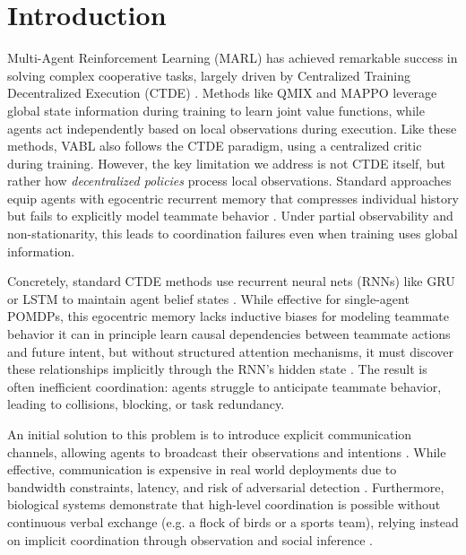\documentclass{article}
\theoremstyle{plain}
\theoremstyle{definition}
\theoremstyle{remark}
\begin{document}
\section{Introduction}

Multi-Agent Reinforcement Learning (MARL) has achieved remarkable success in solving complex cooperative tasks, largely driven by Centralized Training Decentralized Execution (CTDE) \cite{lowe2017multi}. Methods like QMIX \cite{rashid2020monotonic} and MAPPO \cite{yu2022surprising} leverage global state information during training to learn joint value functions, while agents act independently based on local observations during execution. Like these methods, VABL also follows the CTDE paradigm, using a centralized critic during training. However, the key limitation we address is not CTDE itself, but rather how \emph{decentralized policies} process local observations. Standard approaches equip agents with egocentric recurrent memory that compresses individual history but fails to explicitly model teammate behavior \cite{hu2025adaptability, amato2024introduction}. Under partial observability and non-stationarity, this leads to coordination failures even when training uses global information.

Concretely, standard CTDE methods use recurrent neural nets (RNNs) like GRU or LSTM to maintain agent belief states \cite{hausknecht2015deep}. While effective for single-agent POMDPs, this egocentric memory lacks inductive biases for modeling teammate behavior it can in principle learn causal dependencies between teammate actions and future intent, but without structured attention mechanisms, it must discover these relationships implicitly through the RNN's hidden state \cite{phan2023attention}. The result is often inefficient coordination: agents struggle to anticipate teammate behavior, leading to collisions, blocking, or task redundancy.

An initial solution to this problem is to introduce explicit communication channels, allowing agents to broadcast their observations and intentions \cite{foerster2016learning, wang2020learning}. While effective, communication is expensive in real world deployments due to bandwidth constraints, latency, and risk of adversarial detection \cite{liu2025robust}. Furthermore, biological systems demonstrate that high-level coordination is possible without continuous verbal exchange (e.g. a flock of birds or a sports team), relying instead on implicit coordination through observation and social inference \cite{li2020deep}.
\end{document}
